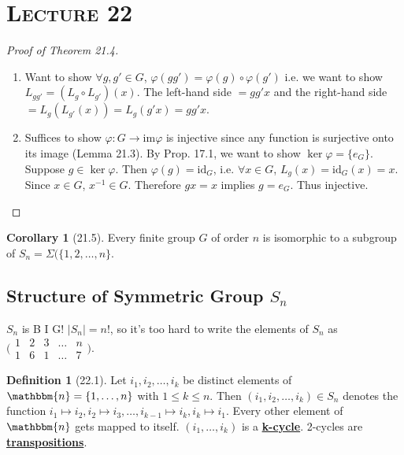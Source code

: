 \documentclass{article}
\newcommand{\id}{\mathrm{id}}
\newcommand{\inverse}[1]{#1^{-1}}
\newcommand{\define}[1]{\textbf{\underline{#1}}}
\newcommand{\func}[3]{#1: #2 \to #3}
\theoremstyle{definition}
\newtheorem*{defn}{Definition}
\newtheorem*{cor}{Corollary}
\theoremstyle{remark}
\newcommand{\im}[1]{\mathrm{im}#1}
\begin{document}
    \section*{\textbf{\textsc{Lecture 22}}}{
        \begin{proof}[Proof of Theorem 21.4]
            \begin{enumerate}
                \item Want to show $\forall g,g'\in G$, $\varphi(gg')=\varphi(g)\circ\varphi(g')$ i.e. we want to show $L_{gg'}=(L_g\circ L_{g'})(x)$. The left-hand side $=gg'x$ and the right-hand side $=L_g(L_{g'}(x))=L_g(g'x)=gg'x$.
                \item Suffices to show $\func{\varphi}{G}{\im\varphi}$ is injective since any function is surjective onto its image (Lemma 21.3). By Prop. 17.1, we want to show $\ker\varphi=\{e_G\}$. Suppose $g\in \ker\varphi$. Then $\varphi(g)=\id_G$, i.e. $\forall x\in G$, $L_g(x)=\id_G(x)=x$. Since $x\in G$, $\inverse{x} \in G$. Therefore $gx=x$ implies $g=e_G$. Thus injective.
            \end{enumerate}
        \end{proof}
        
        \begin{cor}[21.5]
            Every finite group $G$ of order $n$ is isomorphic to a subgroup of $S_n=\Sigma(\{1,2,\ldots,n\}$.
        \end{cor}
        
        \subsection*{Structure of Symmetric Group $S_n$}{
            \noindent $S_n$ is B I G! $|S_n|=n!$, so it's too hard to write the elements of $S_n$ as $\big(\begin{smallmatrix} 1&2&3&\ldots&n\\ 1&6&1&\ldots&7 \end{smallmatrix}\big)$.
            
            \begin{defn}[22.1]
                Let $i_1,i_2,\ldots,i_k$ be distinct elements of $\mathbbm{n}=\{1,\ldots,n\}$ with $1\leq k\leq n$. Then $(i_1,i_2,\ldots, i_k)\in S_n$ denotes the function $i_1 \mapsto i_2,i_2\mapsto i_3,\ldots, i_{k-1}\mapsto i_k, i_k \mapsto i_1$. Every other element of $\mathbbm{n}$ gets mapped to itself. $(i_1,\ldots, i_k)$ is a \define{k-cycle}. 2-cycles are \define{transpositions}.
            \end{defn}
            
}}
\end{document}
